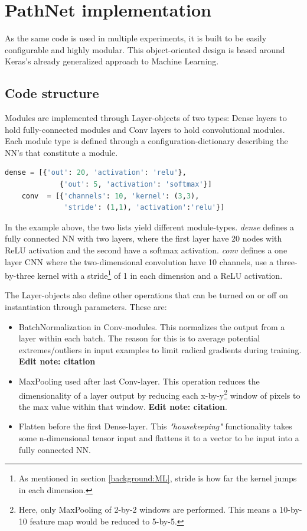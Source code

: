 \section{PathNet implementation}
As the same code is used in multiple experiments, it is built to be easily configurable and highly modular. This object-oriented design is based around Keras's already generalized approach to Machine Learning.

\subsection{Code structure}
Modules are implemented through Layer-objects of two types: Dense layers to hold fully-connected modules and Conv layers to hold convolutional modules. Each module type is defined through a configuration-dictionary describing the NN's that constitute a module. 

\begin{lstlisting}[language=Python]
    dense = [{'out': 20, 'activation': 'relu'}, 
             {'out': 5, 'activation': 'softmax'}]
    conv  = [{'channels': 10, 'kernel': (3,3), 
              'stride': (1,1), 'activation':'relu'}]
\end{lstlisting}
In the example above, the two lists yield different module-types. \textit{dense} defines a fully connected NN with two layers, where the first layer have 20 nodes with ReLU activation and the second have a softmax activation. \textit{conv} defines a one layer CNN where the two-dimensional convolution have 10 channels, use a three-by-three kernel with a stride\footnote{As mentioned in section \ref{background:ML}, stride is how far the kernel jumps in each dimension.} of 1 in each dimension and a ReLU activation.

The Layer-objects also define other operations that can be turned on or off on instantiation through parameters. These are:
\begin{itemize}
    \item BatchNormalization in Conv-modules. This normalizes the output from a layer within each batch. The reason for this is to average potential extremes/outliers in input examples to limit radical gradients during training. \textbf{Edit note: citation}
    \item MaxPooling used after last Conv-layer. This operation reduces the dimensionality of a layer output by reducing each x-by-y\footnote{Here, only MaxPooling of 2-by-2 windows are performed. This means a 10-by-10 feature map would be reduced to 5-by-5.} window of pixels to the max value within that window. \textbf{Edit note: citation}.
    \item Flatten before the first Dense-layer. This \textit{"housekeeping"} functionality takes some n-dimensional tensor input and flattens it to a vector to be input into a fully connected NN.  
\end{itemize}

